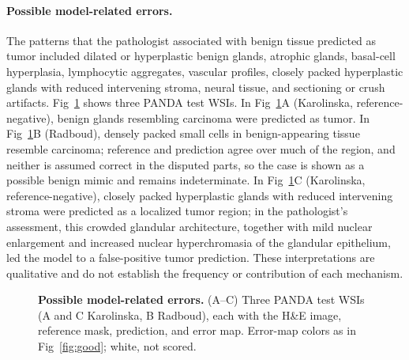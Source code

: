 \documentclass[10pt,letterpaper]{article}
\begin{document}
\paragraph{Possible model-related errors.}
The patterns that the pathologist associated with benign tissue predicted as tumor included dilated or hyperplastic benign glands, atrophic glands, basal-cell hyperplasia, lymphocytic aggregates, vascular profiles, closely packed hyperplastic glands with reduced intervening stroma, neural tissue, and sectioning or crush artifacts. Fig~\ref{fig:model_errors} shows three PANDA test WSIs. In Fig~\ref{fig:model_errors}A (Karolinska, reference-negative), benign glands resembling carcinoma were predicted as tumor. In Fig~\ref{fig:model_errors}B (Radboud), densely packed small cells in benign-appearing tissue resemble carcinoma; reference and prediction agree over much of the region, and neither is assumed correct in the disputed parts, so the case is shown as a possible benign mimic and remains indeterminate. In Fig~\ref{fig:model_errors}C (Karolinska, reference-negative), closely packed hyperplastic glands with reduced intervening stroma were predicted as a localized tumor region; in the pathologist's assessment, this crowded glandular architecture, together with mild nuclear enlargement and increased nuclear hyperchromasia of the glandular epithelium, led the model to a false-positive tumor prediction. These interpretations are qualitative and do not establish the frequency or contribution of each mechanism.

\begin{figure}[H]
\centering
\caption{\textbf{Possible model-related errors.} (A--C) Three PANDA test WSIs (A and C Karolinska, B Radboud), each with the H\&E image, reference mask, prediction, and error map. Error-map colors as in Fig~\ref{fig:good}; white, not scored.}
\label{fig:model_errors}
\end{figure}
\end{document}
